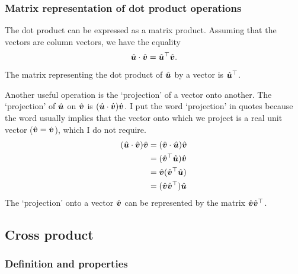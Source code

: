 \subsubsection{Matrix representation of dot product operations}
The dot product can be expressed as a matrix product.
Assuming that the vectors are column vectors, we have the equality
\begin{equation}
    \hat{\bm{u}} \cdot \hat{\bm{v}}
    =
    \hat{\bm{u}}^\top \hat{\bm{v}}
    \text{.}
\end{equation}
The matrix representing the dot product of $\hat{\bm{u}}$ by a vector is $\hat{\bm{u}}^\top$.

Another useful operation is the `projection' of a vector onto another.
The `projection' of $\hat{\bm{u}}$ on $\hat{\bm{v}}$
is $(\hat{\bm{u}} \cdot \hat{\bm{v}})\hat{\bm{v}}$.
I put the word `projection' in quotes because the word usually implies that the vector onto which we project is a real unit vector ($\hat{\bm{v}}=\dot{\bm{v}}$), which I do not require.
\begin{subequations}  
    \label{eq:projection_matrix}
    \begin{align}
        (\hat{\bm{u}} \cdot \hat{\bm{v}})\hat{\bm{v}}
        &=
        (\hat{\bm{v}} \cdot \hat{\bm{u}})\hat{\bm{v}}
        \\
        &=
        (\hat{\bm{v}}^\top \hat{\bm{u}})\hat{\bm{v}}
        \\
        &=
        \hat{\bm{v}}(\hat{\bm{v}}^\top \hat{\bm{u}})
        \\
        &=
        (\hat{\bm{v}} \hat{\bm{v}}^\top) \hat{\bm{u}}
    \end{align}
\end{subequations}
The `projection' onto a vector $\hat{\bm{v}}$ can be represented by the matrix $\hat{\bm{v}} \hat{\bm{v}}^\top$.






\subsection{Cross product}

\subsubsection{Definition and properties}

